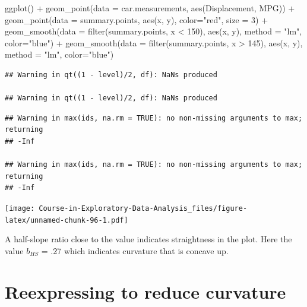 \documentclass[
]{book}
\newenvironment{Shaded}{\begin{snugshade}}{\end{snugshade}}
\newcommand{\AttributeTok}[1]{\textcolor[rgb]{0.77,0.63,0.00}{#1}}
\newcommand{\DecValTok}[1]{\textcolor[rgb]{0.00,0.00,0.81}{#1}}
\newcommand{\FunctionTok}[1]{\textcolor[rgb]{0.00,0.00,0.00}{#1}}
\newcommand{\NormalTok}[1]{#1}
\newcommand{\SpecialCharTok}[1]{\textcolor[rgb]{0.00,0.00,0.00}{#1}}
\newcommand{\StringTok}[1]{\textcolor[rgb]{0.31,0.60,0.02}{#1}}
\begin{document}
\begin{Shaded}
\begin{Highlighting}[]
\FunctionTok{ggplot}\NormalTok{() }\SpecialCharTok{+}
  \FunctionTok{geom\_point}\NormalTok{(}\AttributeTok{data =}\NormalTok{ car.measurements,}
       \FunctionTok{aes}\NormalTok{(Displacement, MPG)) }\SpecialCharTok{+}
  \FunctionTok{geom\_point}\NormalTok{(}\AttributeTok{data =}\NormalTok{ summary.points,}
              \FunctionTok{aes}\NormalTok{(x, y), }\AttributeTok{color=}\StringTok{"red"}\NormalTok{, }\AttributeTok{size =} \DecValTok{3}\NormalTok{) }\SpecialCharTok{+}
  \FunctionTok{geom\_smooth}\NormalTok{(}\AttributeTok{data =} \FunctionTok{filter}\NormalTok{(summary.points, x }\SpecialCharTok{\textless{}} \DecValTok{150}\NormalTok{),}
               \FunctionTok{aes}\NormalTok{(x, y), }\AttributeTok{method =} \StringTok{"lm"}\NormalTok{, }\AttributeTok{color=}\StringTok{"blue"}\NormalTok{) }\SpecialCharTok{+}
  \FunctionTok{geom\_smooth}\NormalTok{(}\AttributeTok{data =} \FunctionTok{filter}\NormalTok{(summary.points, x  }\SpecialCharTok{\textgreater{}} \DecValTok{145}\NormalTok{),}
               \FunctionTok{aes}\NormalTok{(x, y), }\AttributeTok{method =} \StringTok{"lm"}\NormalTok{, }\AttributeTok{color=}\StringTok{"blue"}\NormalTok{)}
\end{Highlighting}
\end{Shaded}

\begin{verbatim}
## Warning in qt((1 - level)/2, df): NaNs produced

## Warning in qt((1 - level)/2, df): NaNs produced
\end{verbatim}

\begin{verbatim}
## Warning in max(ids, na.rm = TRUE): no non-missing arguments to max; returning
## -Inf

## Warning in max(ids, na.rm = TRUE): no non-missing arguments to max; returning
## -Inf
\end{verbatim}

\texttt{[image: Course-in-Exploratory-Data-Analysis\_files/figure-latex/unnamed-chunk-96-1.pdf]}

A half-slope ratio close to the value indicates straightness in the plot. Here the value \(b_{HS}\) = .27 which indicates curvature that is concave up.

\hypertarget{reexpressing-to-reduce-curvature}{%
\section{Reexpressing to reduce curvature}\label{reexpressing-to-reduce-curvature}}
\end{document}
